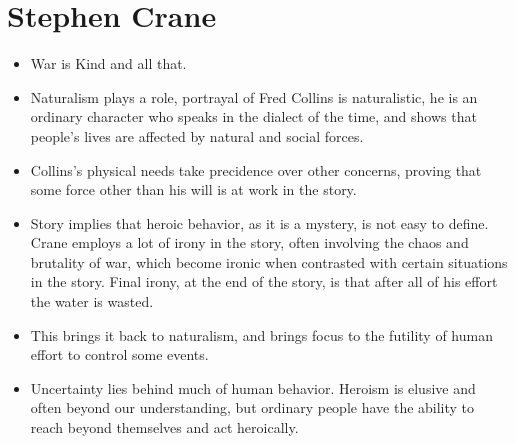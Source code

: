 \documentclass[10pt]{article}
\begin{document}
\section{Stephen Crane}
\begin{itemize}
		\item War is Kind and all that.
		\item Naturalism plays a role, portrayal of Fred Collins is 
			naturalistic, he is an ordinary character who speaks 
			in the dialect of the time, and shows that people's 
			lives are affected by natural and social forces.
		\item Collins's physical needs take precidence over other 
			concerns, proving that some force other than his will 
			is at work in the story.  
		\item Story implies that heroic behavior, as it is a mystery, 
			is not easy to define.  Crane employs a lot of irony 
			in the story, often involving the chaos and brutality 
			of war, which become ironic when contrasted with 
			certain situations in the story.  Final irony, at the 
			end of the story, is that after all of his effort the 
			water is wasted.
		\item This brings it back to naturalism, and brings focus to 
			the futility of human effort to control some events.
		\item Uncertainty lies behind much of human behavior.  Heroism 
			is elusive and often beyond our understanding, but 
			ordinary people have the ability to reach beyond 
			themselves and act heroically. 
\end{itemize}
\end{document}
